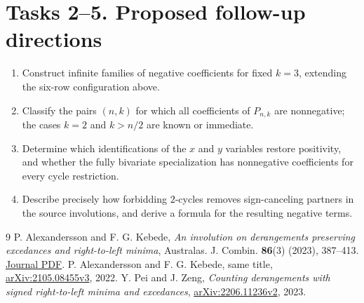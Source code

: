 \documentclass[11pt]{article}
\begin{document}
\section*{Tasks 2--5. Proposed follow-up directions}
\begin{enumerate}[label=\textbf{Task \arabic*.},start=2,leftmargin=*]
\item Construct infinite families of negative coefficients for fixed
$k=3$, extending the six-row configuration above.
\item Classify the pairs $(n,k)$ for which all coefficients of
$P_{n,k}$ are nonnegative; the cases $k=2$ and $k>n/2$ are known
or immediate.
\item Determine which identifications of the $x$ and $y$ variables
restore positivity, and whether the fully bivariate specialization
has nonnegative coefficients for every cycle restriction.
\item Describe precisely how forbidding $2$-cycles removes
sign-canceling partners in the source involutions, and derive a
formula for the resulting negative terms.
\end{enumerate}
\begin{thebibliography}{9}
 P. Alexandersson and F. G. Kebede,
\emph{An involution on derangements preserving excedances and
right-to-left minima}, Australas. J. Combin. \textbf{86}(3) (2023),
387--413. \href{https://ajc.maths.uq.edu.au/pdf/86/ajc_v86_p387.pdf}{Journal PDF}.
 P. Alexandersson and F. G. Kebede, same title,
\href{https://arxiv.org/abs/2105.08455v3}{arXiv:2105.08455v3}, 2022.
 Y. Pei and J. Zeng, \emph{Counting derangements with
signed right-to-left minima and excedances},
\href{https://arxiv.org/abs/2206.11236v2}{arXiv:2206.11236v2}, 2023.
\end{thebibliography}
\end{document}
